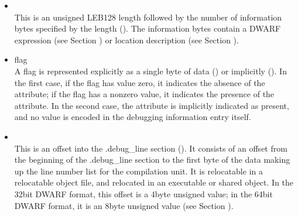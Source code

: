 \begin{itemize}
The data in , 
, 
 and
can be anything. Depending on context, it may
be a signed integer, an unsigned integer, a floating\dash point
constant, or anything else. A consumer must use context to
know how to interpret the bits, which if they are target
machine data (such as an integer or floating point constant)
will be in target machine byte\dash order.

\textit{If one of the <n> forms is used to represent a
signed or unsigned integer, it can be hard for a consumer
to discover the context necessary to determine which
interpretation is intended. Producers are therefore strongly
encouraged to use  or 
 for signed and
unsigned integers respectively, rather than 
 \textless n \textgreater.}


\item {} \\
This is an unsigned LEB128 length followed by the
number of information bytes specified by the length
(). 
The information bytes contain a DWARF
expression 
(see Section ) 
or location description 
(see Section ).

\item flag \\
A flag is represented explicitly as a single byte of data
() or 
implicitly (). 
In the
first case, if the flag has value zero, it indicates the
absence of the attribute; if the flag has a non\dash zero value,
it indicates the presence of the attribute. In the second
case, the attribute is implicitly indicated as present, and
no value is encoded in the debugging information entry itself.

\item {} \\
This is an offset into the .debug\_line section
(). It consists of an offset from the
beginning of the .debug\_line section to the first byte of
the data making up the line number list for the compilation
unit. 
It is relocatable in a relocatable object file, and
relocated in an executable or shared object. In the 32\dash bit
DWARF format, this offset is a 4\dash byte unsigned value;
in the 64\dash bit DWARF format, it is an 8\dash byte unsigned value
(see Section ).



\end{itemize}
